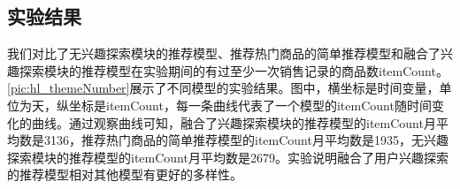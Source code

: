   \subsection{实验结果}
  我们对比了无兴趣探索模块的推荐模型、推荐热门商品的简单推荐模型和融合了兴趣探索模块的推荐模型在实验期间的有过至少一次销售记录的商品数itemCount。\autoref{pic:hl_themeNumber}展示了不同模型的实验结果。图中，横坐标是时间变量，单位为天，纵坐标是itemCount，每一条曲线代表了一个模型的itemCount随时间变化的曲线。通过观察曲线可知，融合了兴趣探索模块的推荐模型的itemCount月平均数是3136，推荐热门商品的简单推荐模型的itemCount月平均数是1935，无兴趣探索模块的推荐模型的itemCount月平均数是2679。实验说明融合了用户兴趣探索的推荐模型相对其他模型有更好的多样性。
  \begin{figure}
  \centering
    \label{pic:hl_themeNumber}
  \end{figure}

